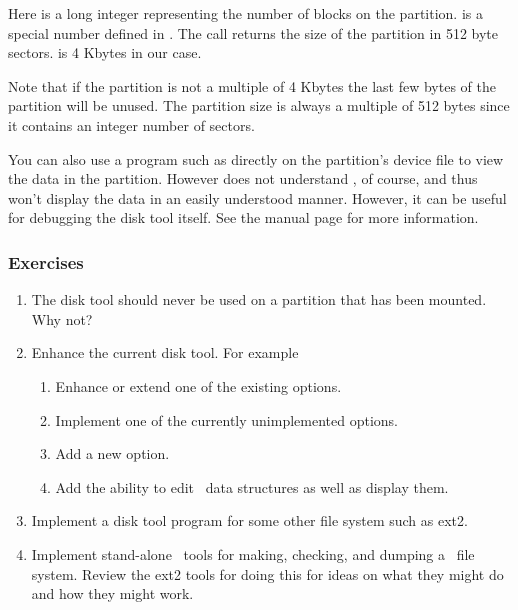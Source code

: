 Here  is a long integer representing the number of blocks on the partition.
 is a special number defined in . The  call
returns the size of the partition in 512 byte sectors.  is 4 Kbytes in our case.

Note that if the partition is not a multiple of 4 Kbytes the last few bytes of the partition
will be unused. The partition size is always a multiple of 512 bytes since it contains an
integer number of sectors.

You can also use a program such as  directly on the partition's device file to view
the data in the partition. However  does not understand \GenericFS, of course, and
thus won't display the data in an easily understood manner. However, it can be useful for
debugging the disk tool itself. See the  manual page for more information.

\subsubsection*{Exercises}

\begin{enumerate}

\item The disk tool should never be used on a partition that has been mounted. Why not?

\item Enhance the current disk tool. For example

  \begin{enumerate}
    \item Enhance or extend one of the existing options.
    \item Implement one of the currently unimplemented options.
    \item Add a new option.
    \item Add the ability to edit \GenericFS\ data structures as well as
      display them.
  \end{enumerate}
  
\item Implement a disk tool program for some other file system such as ext2.

\item Implement stand-alone \GenericFS\ tools for making, checking, and dumping a \GenericFS\
  file system. Review the ext2 tools for doing this for ideas on what they might do and how they
  might work.

\end{enumerate}

